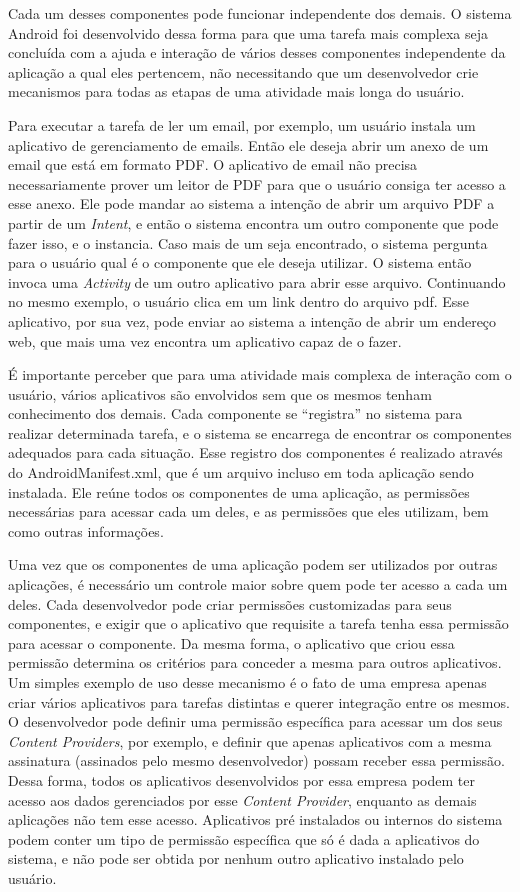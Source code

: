 Cada um desses componentes pode funcionar independente dos demais. O sistema Android foi desenvolvido dessa forma para que uma tarefa mais complexa seja concluída com a ajuda e interação de vários desses componentes independente da aplicação a qual eles pertencem, não necessitando que um desenvolvedor crie mecanismos para todas as etapas de uma atividade mais longa do usuário.  

Para executar a tarefa de ler um email, por exemplo, um usuário instala um aplicativo de gerenciamento de emails. Então ele deseja abrir um anexo de um email que está em formato PDF. O aplicativo de email não precisa necessariamente prover um leitor de PDF para que o usuário consiga ter acesso a esse anexo. Ele pode mandar ao sistema a intenção de abrir um arquivo PDF a partir de um \textit{Intent}, e então o sistema encontra um outro componente que pode fazer isso, e o instancia. Caso mais de um seja encontrado, o sistema pergunta para o usuário qual é o componente que ele deseja utilizar. O sistema então invoca uma \textit{Activity} de um outro aplicativo para abrir esse arquivo. Continuando no mesmo exemplo, o usuário clica em um link dentro do arquivo pdf. Esse aplicativo, por sua vez, pode enviar ao sistema a intenção de abrir um endereço web, que mais uma vez encontra um aplicativo capaz de o fazer.  

É importante perceber que para uma atividade mais complexa de interação com o usuário, vários aplicativos são envolvidos sem que os mesmos tenham conhecimento dos demais. Cada componente se ``registra'' no sistema para realizar determinada tarefa, e o sistema se encarrega de encontrar os componentes adequados para cada situação. Esse registro dos componentes é realizado através do AndroidManifest.xml, que é um arquivo incluso em toda aplicação sendo instalada. Ele reúne todos os componentes de uma aplicação, as permissões necessárias para acessar cada um deles, e as permissões que eles utilizam, bem como outras informações. 

Uma vez que os componentes de uma aplicação podem ser utilizados por outras aplicações, é necessário um controle maior sobre quem pode ter acesso a cada um deles. Cada desenvolvedor pode criar permissões customizadas para seus componentes, e exigir que o aplicativo que requisite a tarefa tenha essa permissão para acessar o componente. Da mesma forma, o aplicativo que criou essa permissão determina os critérios para conceder a mesma para outros aplicativos. Um simples exemplo de uso desse mecanismo é o fato de uma empresa apenas criar vários aplicativos para tarefas distintas e querer integração entre os mesmos. O desenvolvedor pode definir uma permissão específica para acessar um dos seus \textit{Content Providers}, por exemplo, e definir que apenas aplicativos com a mesma assinatura (assinados pelo mesmo desenvolvedor) possam receber essa permissão. Dessa forma, todos os aplicativos desenvolvidos por essa empresa podem ter acesso aos dados gerenciados por esse \textit{Content Provider}, enquanto as demais aplicações não tem esse acesso. Aplicativos pré instalados ou internos do sistema podem conter um tipo de permissão específica que só é dada a aplicativos do sistema, e não pode ser obtida por nenhum outro aplicativo instalado pelo usuário.

